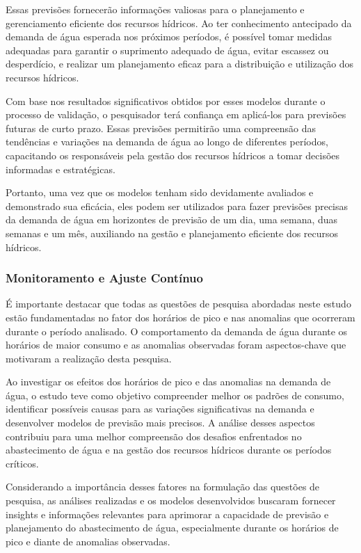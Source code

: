 Essas previsões fornecerão informações valiosas para o planejamento e gerenciamento eficiente dos recursos hídricos. Ao ter conhecimento antecipado da demanda de água esperada nos próximos períodos, é possível tomar medidas adequadas para garantir o suprimento adequado de água, evitar escassez ou desperdício, e realizar um planejamento eficaz para a distribuição e utilização dos recursos hídricos.

Com base nos resultados significativos obtidos por esses modelos durante o processo de validação, o pesquisador terá confiança em aplicá-los para previsões futuras de curto prazo. Essas previsões permitirão uma compreensão das tendências e variações na demanda de água ao longo de diferentes períodos, capacitando os responsáveis pela gestão dos recursos hídricos a tomar decisões informadas e estratégicas.

Portanto, uma vez que os modelos tenham sido devidamente avaliados e demonstrado sua eficácia, eles podem ser utilizados para fazer previsões precisas da demanda de água em horizontes de previsão de um dia, uma semana, duas semanas e um mês, auxiliando na gestão e planejamento eficiente dos recursos hídricos.

\subsubsection{Monitoramento e Ajuste Cont\'inuo}


É importante destacar que todas as questões de pesquisa abordadas neste estudo estão fundamentadas no fator dos horários de pico e nas anomalias que ocorreram durante o período analisado. O comportamento da demanda de água durante os horários de maior consumo e as anomalias observadas foram aspectos-chave que motivaram a realização desta pesquisa.

Ao investigar os efeitos dos horários de pico e das anomalias na demanda de água, o estudo teve como objetivo compreender melhor os padrões de consumo, identificar possíveis causas para as variações significativas na demanda e desenvolver modelos de previsão mais precisos. A análise desses aspectos contribuiu para uma melhor compreensão dos desafios enfrentados no abastecimento de água e na gestão dos recursos hídricos durante os períodos críticos.

Considerando a importância desses fatores na formulação das questões de pesquisa, as análises realizadas e os modelos desenvolvidos buscaram fornecer insights e informações relevantes para aprimorar a capacidade de previsão e planejamento do abastecimento de água, especialmente durante os horários de pico e diante de anomalias observadas.

